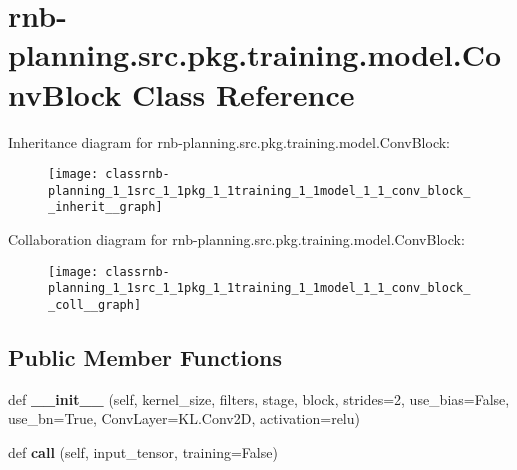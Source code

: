 \hypertarget{classrnb-planning_1_1src_1_1pkg_1_1training_1_1model_1_1_conv_block}{}\section{rnb-\/planning.src.\+pkg.\+training.\+model.\+Conv\+Block Class Reference}
\label{classrnb-planning_1_1src_1_1pkg_1_1training_1_1model_1_1_conv_block}


Inheritance diagram for rnb-\/planning.src.\+pkg.\+training.\+model.\+Conv\+Block\+:\nopagebreak
\begin{figure}[H]
\begin{center}
\leavevmode
\texttt{[image: classrnb-planning\_1\_1src\_1\_1pkg\_1\_1training\_1\_1model\_1\_1\_conv\_block\_\_inherit\_\_graph]}
\end{center}
\end{figure}


Collaboration diagram for rnb-\/planning.src.\+pkg.\+training.\+model.\+Conv\+Block\+:\nopagebreak
\begin{figure}[H]
\begin{center}
\leavevmode
\texttt{[image: classrnb-planning\_1\_1src\_1\_1pkg\_1\_1training\_1\_1model\_1\_1\_conv\_block\_\_coll\_\_graph]}
\end{center}
\end{figure}
\subsection*{Public Member Functions}
\begin{DoxyCompactItemize}
\item 
\mbox{\label{classrnb-planning_1_1src_1_1pkg_1_1training_1_1model_1_1_conv_block_a1fffe669404961596b4e39428815edb8}} 
def {\bfseries \+\_\+\+\_\+init\+\_\+\+\_\+} (self, kernel\+\_\+size, filters, stage, block, strides=2, use\+\_\+bias=False, use\+\_\+bn=True, Conv\+Layer=K\+L.\+Conv2D, activation=\textquotesingle{}relu\textquotesingle{})
\item 
\mbox{\label{classrnb-planning_1_1src_1_1pkg_1_1training_1_1model_1_1_conv_block_acdf522e2ef2ae27309b78d81ab7cefc0}} 
def {\bfseries call} (self, input\+\_\+tensor, training=False)
\end{DoxyCompactItemize}
